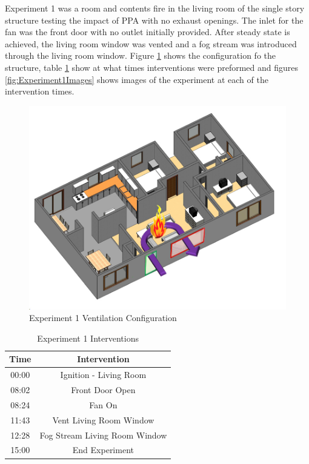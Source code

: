 \documentclass{article}
\begin{document}
Experiment 1 was a room and contents fire in the living room of the single story structure testing the impact of PPA with no exhaust openings. The inlet for the fan was the front door with no outlet initially provided. After steady state is achieved, the living room window was vented and a fog stream was introduced through the living room window. Figure \ref{fig:Exp1VentConfig} shows the configuration fo the structure, table \ref{Table:Exp1Interventions} show at what times interventions were preformed and figures \ref{fig:Experiment1Images} shows images of the experiment at each of the intervention times.

 \begin{figure}[h!]
 	\centering
 	\includegraphics[width=5in]{0_Images/FireExperiments/Single_Story/Experiment_1.jpg}
 	\caption{Experiment 1 Ventilation Configuration}
 	\label{fig:Exp1VentConfig}
 \end{figure}

\begin{table}[H]
	\centering
	\caption{Experiment 1 Interventions}
	\begin{tabular}{|c|c|} 
		\hline
		Time & Intervention \\ \hline \hline
		00:00 & Ignition - Living Room \\ \hline
		08:02 & Front Door Open \\ \hline
		08:24 & Fan On \\ \hline
		11:43 & Vent Living Room Window \\ \hline
		12:28 & Fog Stream Living Room Window \\ \hline
		15:00 & End Experiment\\ \hline
	\end{tabular}
	\label{Table:Exp1Interventions}
\end{table}
\end{document}
